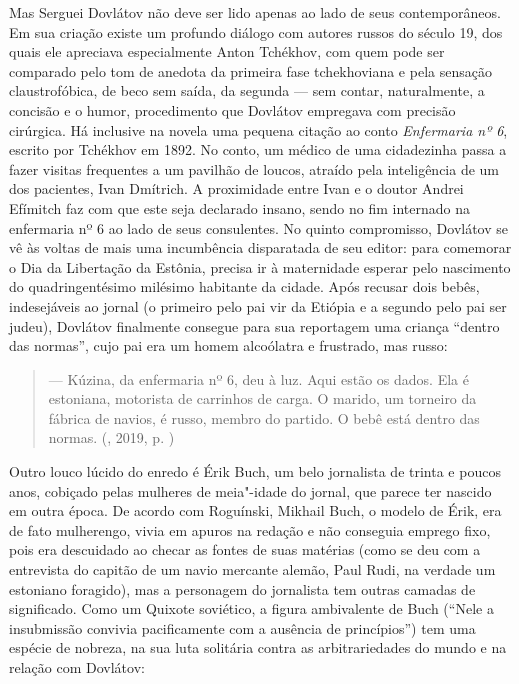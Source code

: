Mas Serguei Dovlátov não deve ser lido apenas ao lado de seus
contemporâneos. Em sua criação existe um profundo diálogo com autores
russos do século 19, dos quais ele apreciava especialmente Anton
Tchékhov, com quem pode ser comparado pelo tom de anedota da primeira
fase tchekhoviana e pela sensação claustrofóbica, de beco sem saída, da
segunda --- sem contar, naturalmente, a concisão e o humor, procedimento
que Dovlátov empregava com precisão cirúrgica. Há inclusive na novela
uma pequena citação ao conto \emph{Enfermaria nº 6}, escrito por
Tchékhov em 1892. No conto, um médico de uma cidadezinha passa a fazer
visitas frequentes a um pavilhão de loucos, atraído pela inteligência de
um dos pacientes, Ivan Dmítrich. A proximidade entre Ivan e o doutor
Andrei Efímitch faz com que este seja declarado insano, sendo no fim
internado na enfermaria nº 6 ao lado de seus consulentes. No quinto
compromisso, Dovlátov se vê às voltas de mais uma incumbência
disparatada de seu editor: para comemorar o Dia da Libertação da
Estônia, precisa ir à maternidade esperar pelo nascimento do
quadringentésimo milésimo habitante da cidade. Após recusar dois bebês,
indesejáveis ao jornal (o primeiro pelo pai vir da Etiópia e a segundo
pelo pai ser judeu), Dovlátov finalmente consegue para sua reportagem
uma criança ``dentro das normas'', cujo pai era um homem alcoólatra e
frustrado, mas russo:

\begin{quotation}
--- Kúzina, da enfermaria nº 6, deu à luz. Aqui estão os dados. Ela é
estoniana, motorista de carrinhos de carga. O marido, um torneiro da
fábrica de navios, é russo, membro do partido. O bebê está dentro das
normas. 
{}(, 2019, p. \pageref{ref4})
\end{quotation}

Outro louco lúcido do enredo é Érik Buch, um belo jornalista de trinta e
poucos anos, cobiçado pelas mulheres de meia"-idade do jornal, que parece
ter nascido em outra época. De acordo com Roguínski, Mikhail Buch, o
modelo de Érik, era de fato mulherengo, vivia em apuros na redação e não
conseguia emprego fixo, pois era descuidado ao checar as fontes de suas
matérias (como se deu com a entrevista do capitão de um navio mercante
alemão, Paul Rudi, na verdade um estoniano foragido), mas a personagem
do jornalista tem outras camadas de significado. Como um Quixote
soviético, a figura ambivalente de Buch (``Nele a insubmissão convivia
pacificamente com a ausência de princípios'') tem uma espécie de
nobreza, na sua luta solitária contra as arbitrariedades do mundo e na
relação com Dovlátov:


